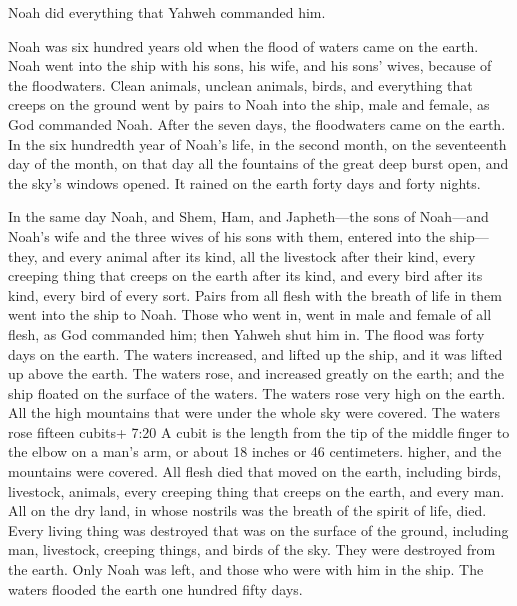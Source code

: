  Noah did everything that Yahweh commanded him.

 Noah was six hundred years old when the flood of waters
came on the earth.  Noah went into the ship with his sons,
his wife, and his sons' wives, because of the floodwaters. 
Clean animals, unclean animals, birds, and everything that creeps on the
ground  went by pairs to Noah into the ship, male and
female, as God commanded Noah.  After the seven days, the
floodwaters came on the earth.  In the six hundredth year
of Noah's life, in the second month, on the seventeenth day of the
month, on that day all the fountains of the great deep burst open, and
the sky's windows opened.  It rained on the earth forty
days and forty nights.

 In the same day Noah, and Shem, Ham, and Japheth---the
sons of Noah---and Noah's wife and the three wives of his sons with
them, entered into the ship---  they, and every animal
after its kind, all the livestock after their kind, every creeping thing
that creeps on the earth after its kind, and every bird after its kind,
every bird of every sort.  Pairs from all flesh with the
breath of life in them went into the ship to Noah.  Those
who went in, went in male and female of all flesh, as God commanded him;
then Yahweh shut him in.  The flood was forty days on the
earth. The waters increased, and lifted up the ship, and it was lifted
up above the earth.  The waters rose, and increased greatly
on the earth; and the ship floated on the surface of the waters.
 The waters rose very high on the earth. All the high
mountains that were under the whole sky were covered.  The
waters rose fifteen cubits+ 7:20 A cubit is the length from the tip of
the middle finger to the elbow on a man's arm, or about 18 inches or 46
centimeters. higher, and the mountains were covered.  All
flesh died that moved on the earth, including birds, livestock, animals,
every creeping thing that creeps on the earth, and every man.
 All on the dry land, in whose nostrils was the breath of
the spirit of life, died.  Every living thing was destroyed
that was on the surface of the ground, including man, livestock,
creeping things, and birds of the sky. They were destroyed from the
earth. Only Noah was left, and those who were with him in the ship.
 The waters flooded the earth one hundred fifty days.

